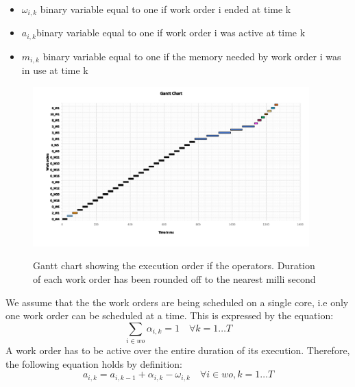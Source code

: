\documentclass[20pt]{sigchi}
\begin{document}
\begin {itemize}
\item []\hspace{1em}$\omega_{i,k}$\hspace{1em} binary variable equal to one if work order i ended at time  k
\item []\hspace{1em}$a_{i,k}$\hspace{1em}binary variable equal to one if work order i was active at time k
\item []\hspace{1em}$m_{i,k}$\hspace{1em} binary variable equal to one if  the memory needed by work order i was in use at time k
\end {itemize}
\begin{figure}[t]
  \centering
    \includegraphics[width=0.95\textwidth]{figures/GanttChart}
   	\label{fig3:gantt-chart}
	      \caption{Gantt chart showing the execution order if the operators. Duration of each work order has been rounded off to the nearest milli second}
\end{figure}
We assume that the the work orders are being scheduled on a single core, i.e only one work order can be scheduled at a time.
This is expressed by the equation:
\begin{equation}
\sum\limits_{i \in wo} \alpha_{i,k} =1\hspace{1em}\forall k = 1 \hdots  T
\end{equation}
A work order  has to be active over the entire duration of its execution. Therefore, the following equation holds by definition:
\begin{equation}
     a_{i,k} =a_{i,k-1} + \alpha_{i,k}-\omega_{i,k}\hspace{1em}   \forall i \in wo, k = 1 \hdots  T
\end{equation}
\end{document}
